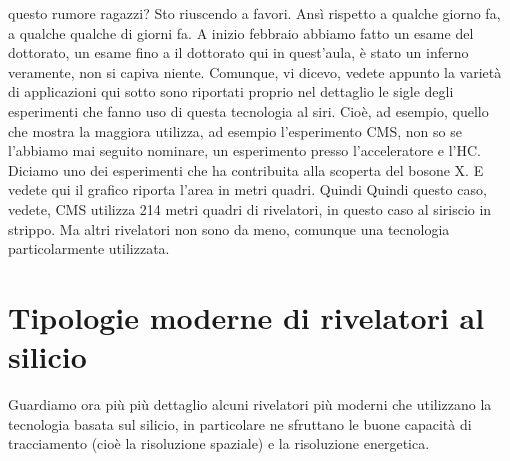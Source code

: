 {questo rumore ragazzi? Sto riuscendo a favori. Ansì rispetto a qualche giorno fa, a qualche qualche di giorni fa. A inizio febbraio abbiamo fatto un esame del dottorato, un esame fino a il dottorato qui in quest'aula, è stato un inferno veramente, non si capiva niente. Comunque, vi dicevo, vedete appunto la varietà di applicazioni qui sotto sono riportati proprio nel dettaglio le sigle degli esperimenti che fanno uso di questa tecnologia al siri. Cioè, ad esempio, quello che mostra la maggiora utilizza, ad esempio l'esperimento CMS, non so se l'abbiamo mai seguito nominare, un esperimento presso l'acceleratore e l'HC. Diciamo uno dei esperimenti che ha contribuita alla scoperta del bosone X. E vedete qui il grafico riporta l'area in metri quadri. Quindi Quindi questo caso, vedete, CMS utilizza 214 metri quadri di rivelatori, in questo caso al siriscio in strippo. Ma altri rivelatori non sono da meno, comunque una tecnologia particolarmente utilizzata.}

\section{Tipologie moderne di rivelatori al silicio}
Guardiamo ora più più dettaglio alcuni rivelatori più moderni che utilizzano la tecnologia basata sul silicio, in particolare ne sfruttano le buone capacità di tracciamento (cioè la risoluzione spaziale) e la risoluzione energetica.

